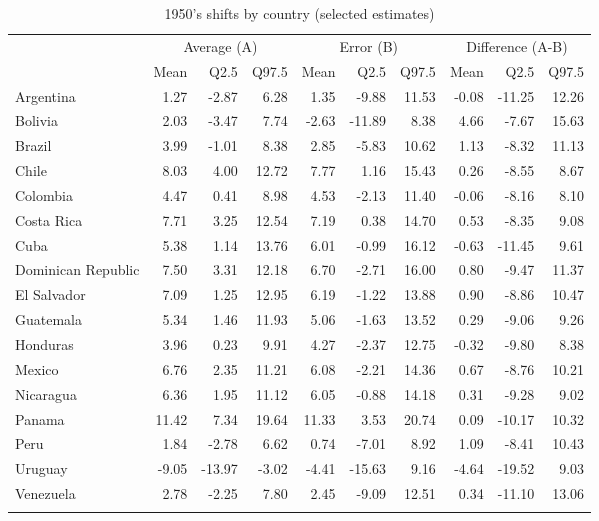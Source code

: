 \renewcommand{\arraystretch}{1.2}
\setlength{\tabcolsep}{10pt}
\begin{table}[htp]
\centering
\caption{1950's shifts by country (selected estimates)} 
\label{tab:shift1950selected}
\scriptsize
\begin{tabular}{lrrrrrrrrr}
  \hline
  \addlinespace
    & \multicolumn{3}{c}{Average (A)}  & \multicolumn{3}{c}{Error (B)} & \multicolumn{3}{c}{Difference (A-B)}  \\
    \cmidrule(lr){2-4}\cmidrule(lr){5-7}\cmidrule(lr){8-10}
 & Mean & Q2.5 & Q97.5 & Mean & Q2.5 & Q97.5 & Mean & Q2.5 & Q97.5 \\ 
 \addlinespace
  \hline
\addlinespace 
Argentina & 1.27 & -2.87 & 6.28 & 1.35 & -9.88 & 11.53 & -0.08 & -11.25 & 12.26 \\ 
  Bolivia & 2.03 & -3.47 & 7.74 & -2.63 & -11.89 & 8.38 & 4.66 & -7.67 & 15.63 \\ 
  Brazil & 3.99 & -1.01 & 8.38 & 2.85 & -5.83 & 10.62 & 1.13 & -8.32 & 11.13 \\ 
  Chile & 8.03 & 4.00 & 12.72 & 7.77 & 1.16 & 15.43 & 0.26 & -8.55 & 8.67 \\ 
  Colombia & 4.47 & 0.41 & 8.98 & 4.53 & -2.13 & 11.40 & -0.06 & -8.16 & 8.10 \\ 
  Costa Rica & 7.71 & 3.25 & 12.54 & 7.19 & 0.38 & 14.70 & 0.53 & -8.35 & 9.08 \\ 
  Cuba & 5.38 & 1.14 & 13.76 & 6.01 & -0.99 & 16.12 & -0.63 & -11.45 & 9.61 \\ 
  Dominican Republic & 7.50 & 3.31 & 12.18 & 6.70 & -2.71 & 16.00 & 0.80 & -9.47 & 11.37 \\ 
  El Salvador & 7.09 & 1.25 & 12.95 & 6.19 & -1.22 & 13.88 & 0.90 & -8.86 & 10.47 \\ 
  Guatemala & 5.34 & 1.46 & 11.93 & 5.06 & -1.63 & 13.52 & 0.29 & -9.06 & 9.26 \\ 
  Honduras & 3.96 & 0.23 & 9.91 & 4.27 & -2.37 & 12.75 & -0.32 & -9.80 & 8.38 \\ 
  Mexico & 6.76 & 2.35 & 11.21 & 6.08 & -2.21 & 14.36 & 0.67 & -8.76 & 10.21 \\ 
  Nicaragua & 6.36 & 1.95 & 11.12 & 6.05 & -0.88 & 14.18 & 0.31 & -9.28 & 9.02 \\ 
  Panama & 11.42 & 7.34 & 19.64 & 11.33 & 3.53 & 20.74 & 0.09 & -10.17 & 10.32 \\ 
  Peru & 1.84 & -2.78 & 6.62 & 0.74 & -7.01 & 8.92 & 1.09 & -8.41 & 10.43 \\ 
  Uruguay & -9.05 & -13.97 & -3.02 & -4.41 & -15.63 & 9.16 & -4.64 & -19.52 & 9.03 \\ 
  Venezuela & 2.78 & -2.25 & 7.80 & 2.45 & -9.09 & 12.51 & 0.34 & -11.10 & 13.06 \\ 
    \addlinespace
\hline
\end{tabular}
\end{table}
